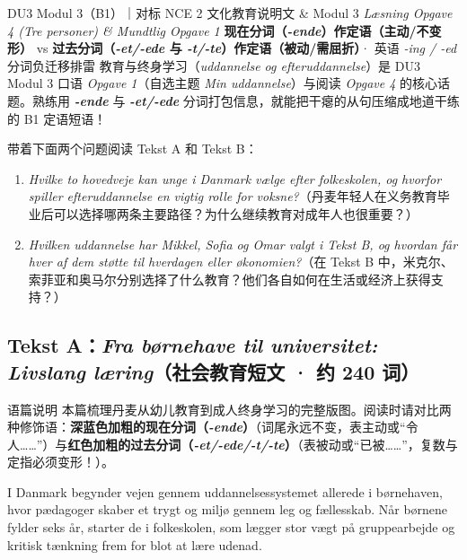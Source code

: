 {DU3 Modul 3（B1）｜对标 NCE 2 文化教育说明文 \& Modul 3 \textit{Læsning Opgave 4 (Tre personer) \& Mundtlig Opgave 1}}
{\textbf{现在分词（\textit{-ende}）作定语（主动/不变形）} vs \textbf{过去分词（\textit{-et/-ede} 与 \textit{-t/-te}）作定语（被动/需屈折）}· 英语 \textit{-ing / -ed} 分词负迁移排雷}
{教育与终身学习（\textit{uddannelse og efteruddannelse}）是 DU3 Modul 3 口语 \textit{Opgave 1}（自选主题 \textit{Min uddannelse}）与阅读 \textit{Opgave 4} 的核心话题。熟练用 \textbf{\textit{-ende}} 与 \textbf{\textit{-et/-ede}} 分词打包信息，就能把干瘪的从句压缩成地道干练的 B1 定语短语！}

\begin{foerduleaeser}
带着下面两个问题阅读 Tekst A 和 Tekst B：
\begin{enumerate}
  \item \textit{Hvilke to hovedveje kan unge i Danmark vælge efter folkeskolen, og hvorfor spiller efteruddannelse en vigtig rolle for voksne?}（丹麦年轻人在义务教育毕业后可以选择哪两条主要路径？为什么继续教育对成年人也很重要？）
  \item \textit{Hvilken uddannelse har Mikkel, Sofia og Omar valgt i Tekst B, og hvordan får hver af dem støtte til hverdagen eller økonomien?}（在 Tekst B 中，米克尔、索菲亚和奥马尔分别选择了什么教育？他们各自如何在生活或经济上获得支持？）
\end{enumerate}
\end{foerduleaeser}


\subsection*{Tekst A：\textit{Fra børnehave til universitet: Livslang læring}（社会教育短文 · 约 240 词）}

\begin{tipbox}{语篇说明}
本篇梳理丹麦从幼儿教育到成人终身学习的完整版图。阅读时请对比两种修饰语：\textbf{\color{NCDNavy}深蓝色加粗的现在分词（\textit{-ende}）}（词尾永远不变，表主动或“令人……”）与\textbf{\color{NCDRed}红色加粗的过去分词（\textit{-et/-ede/-t/-te}）}（表被动或“已被……”，复数与定指必须变形！）。
\end{tipbox}

I Danmark begynder vejen gennem uddannelsessystemet allerede i børnehaven, hvor  pædagoger skaber et trygt og  miljø gennem leg og fællesskab. Når børnene fylder seks år, starter de i folkeskolen, som lægger stor vægt på  gruppearbejde og kritisk tænkning frem for blot at lære udenad.

